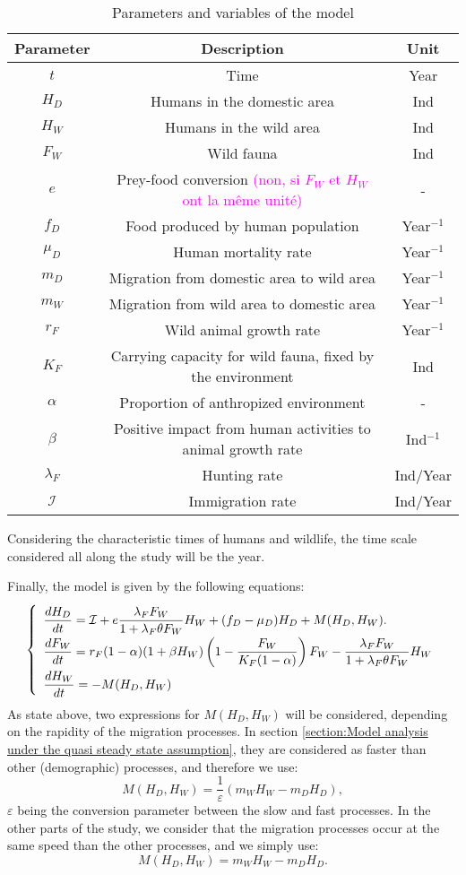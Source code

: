 \documentclass{article}
\newcommand{\lfw}{\lambda_{F}}
\newcommand{\lfw}{\lambda_{F}}
\newcommand{\cI}{\mathcal{I}}
\newcommand{\YD}[1]{\textcolor{magenta}{#1}}
\renewcommand{\epsilon}{\varepsilon}
\begin{document}
\begin{table}[ht]
\center
\begin{tabular}{|c|c|c|}
\hline 
Parameter & Description & Unit \\ 
\hline \hline
$t$ & Time & Year \\
\hline
$H_D$ & Humans in the domestic area & Ind \\
$H_W$ & Humans in the wild area & Ind \\
$F_W$ & Wild fauna & Ind \\
\hline
$e$ & Prey-food conversion \YD{(non, si $F_W$ et $H_W$ ont la même unité)} & - \\
$f_D$ & Food produced by human population & Year$^{-1}$ \\
$\mu_D$ & Human mortality rate  & Year$^{-1}$ \\
$m_D$ & Migration from domestic area to wild area & Year$^{-1}$ \\
$m_W$ & Migration from wild area to domestic area & Year$^{-1}$ \\
$r_F$ & Wild animal growth rate & Year$^{-1}$ \\
$K_F$ & Carrying capacity for wild fauna, fixed by the environment& Ind \\
$\alpha$ & Proportion of anthropized environment & - \\
$\beta$ & Positive impact from human activities to animal growth rate & Ind$^{-1}$  \\
$\lfw$ & Hunting rate & Ind/Year\\
$\mathcal{I}$ & Immigration rate &Ind/Year\\
\hline
\end{tabular}
\caption{Parameters and variables of the model}
\end{table}

Considering the characteristic times of humans and wildlife, the time scale considered all along the study will be the year.
\medskip

Finally, the model is given by the following equations:
\begin{equation}
\def\arraystretch{2}
\left\{ 
\begin{array}{l}
\dfrac{dH_D}{dt}= \cI + e\dfrac{\lfw F_W}{1 + \lfw \theta F_W}H_W + (f_D - \mu_D) H_D + M(H_D, H_W). \\
\dfrac{dF_W}{dt} = r_F(1- \alpha) (1+ \beta H_W) \left(1 - \dfrac{F_W}{K_F(1-\alpha)} \right) F_W - \dfrac{\lfw F_W}{1 + \lfw \theta F_W} H_W \\
\dfrac{dH_W}{dt}= - M(H_D, H_W) 
\end{array} \right.
\label{equationsHDFWHW}
\end{equation}
As state above, two expressions for  $M(H_D, H_W)$ will be considered, depending on the rapidity of the migration processes. In section \ref{section:Model analysis under the quasi steady state assumption}, they are considered as faster than other (demographic) processes, and therefore we use:
 $$M(H_D, H_W)  = \dfrac{1}{\epsilon}(m_W H_W - m_D H_D),$$ $\epsilon$ being the conversion parameter between the slow and fast processes. In the other parts of the study, we consider that the migration processes occur at the same speed than the other processes, and we simply use:
$$ M(H_D, H_W)  = m_W H_W - m_D H_D.$$
\end{document}
